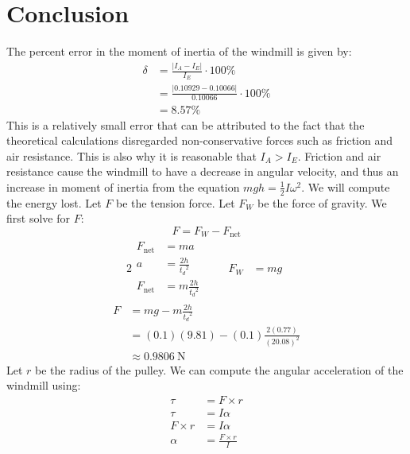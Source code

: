 \documentclass[article, 11pt]{article}
\newcommand{\df}{\displaystyle\frac} %
\begin{document}
    \section{Conclusion}
    \noindent
    The percent error in the moment of inertia of the windmill is given by:
    \begin{align*}
        \delta &= \frac{|I_A - I_E|}{I_E} \cdot 100\% \\
               &= \frac{|0.10929 - 0.10066|}{0.10066} \cdot 100\% \\
               &= 8.57\%
    \end{align*}
    This is a relatively small error that can be attributed to the fact that the theoretical calculations disregarded non-conservative forces such as friction and air resistance. This is also why it is reasonable that $I_A > I_E$. Friction and air resistance cause the windmill to have a decrease in angular velocity, and thus an increase in moment of inertia from the equation $mgh = \df{1}{2}I\omega^2$. We will compute the energy lost.
    Let $F$ be the tension force. Let $F_W$ be the force of gravity. We first solve for $F$:
    \begin{equation*}
        F = F_W - F_\text{net}
    \end{equation*}
    \begin{alignat*}{2}
        \begin{aligned}
            F_\text{net} &= ma \\
                       a &= \frac{2h}{{t_d}^2} \\
            F_\text{net} &= m\frac{2h}{{t_d}^2}
        \end{aligned} & \quad
        \begin{aligned}
            F_W &= mg
        \end{aligned}
    \end{alignat*}
    \begin{align*}
        F &= mg - m\frac{2h}{{t_d}^2} \\
          &= (0.1)(9.81) - (0.1)\frac{2(0.77)}{(20.08)^2} \\
          &\approx \SI{0.9806}{\newton}
    \end{align*}
    Let $r$ be the radius of the pulley. We can compute the angular acceleration of the windmill using:
    \begin{align*}
        \tau &= F \times r \\
        \tau &= I \alpha \\
        F \times r &= I \alpha \\
        \alpha &= \frac{F \times r}{I}
    \end{align*}
\end{document}
